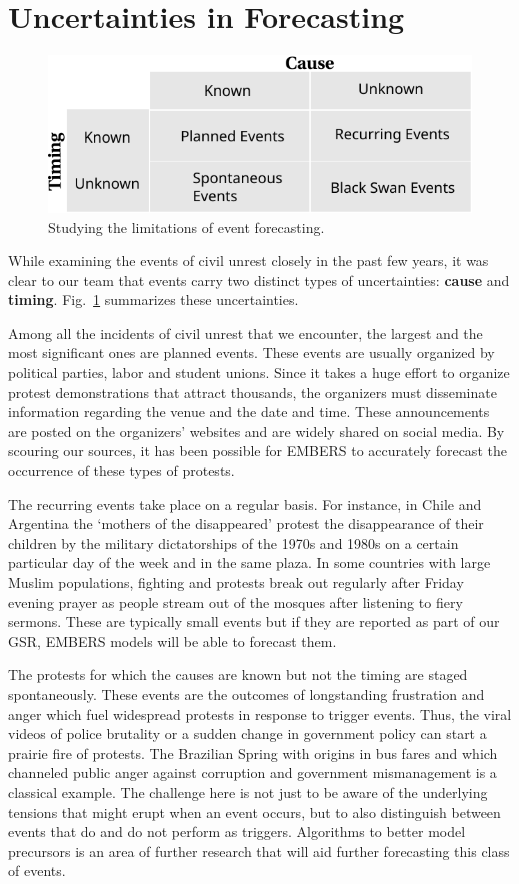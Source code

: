 \section{Uncertainties in Forecasting}
\label{limitations}
\begin{figure}
\centering
  \includegraphics[width=.9\columnwidth]{figures/cu/event_confusionMatrix}
\caption{Studying the limitations of event forecasting.}
\label{rumsfeld}
\end{figure}

While examining the events of civil unrest closely
in the past few years, it was clear to our
team that events carry two distinct types of uncertainties: {\bf cause}
and {\bf timing}.
Fig.~\ref{rumsfeld} summarizes these uncertainties.

Among all the incidents of civil unrest that we encounter, the largest and the most significant ones
are planned events.  These events are usually organized by political parties, labor and student unions.
Since it takes a huge effort to organize protest demonstrations that
attract thousands, the organizers must disseminate information regarding the venue
and the date and time.  These announcements are posted on the organizers’ websites and
are widely shared on social media.  By scouring our sources,
it has been possible for EMBERS to accurately forecast the occurrence of these types of protests.

The recurring events take place on a regular basis.  For instance, in Chile and Argentina the
`mothers of the disappeared' protest the disappearance of their children by the military dictatorships
of the 1970s and 1980s on a certain particular day of the week and in the same plaza.
In some countries with large Muslim populations, fighting and protests break out regularly after
Friday evening prayer as people stream out of the mosques after listening
to fiery sermons. These are typically small events but if they are reported as part of our GSR,
EMBERS models will be able to forecast them.

The protests for which the causes are known but not the timing are staged spontaneously.  These
events are the outcomes of longstanding frustration and anger which fuel widespread
protests in response to trigger events.  Thus, the viral videos of police brutality or
a sudden change in government policy can start a prairie fire of protests.  The Brazilian
Spring with origins in bus fares and which channeled
public anger against corruption and government mismanagement is a classical example. The challenge here
is not just to be aware of the underlying tensions that might erupt when an event occurs, but to also
distinguish between events that do and do not perform as triggers. Algorithms to better model
precursors is an area of further research that will aid further forecasting this class of events.

